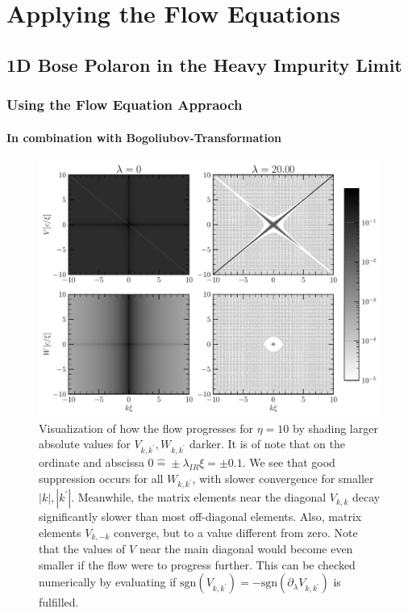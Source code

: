 \chapter{Applying the Flow Equations}\label{Results}
\section{1D Bose Polaron in the Heavy Impurity Limit}
\subsection{Using the Flow Equation Appraoch}
\subsubsection{In combination with Bogoliubov-Transformation}
\begin{figure}[H]
    \centering
    \includegraphics[width=\textwidth]{figures/plots/PDF/FlowIllustration.pdf}
    \caption[Flow Visualization for $\eta=10$]{Visualization of how the flow progresses for $\eta=10$ by shading larger absolute values for $V_{k,k^\prime},W_{k,k^\prime}$ darker. It is of note that on the ordinate and abscissa $0\widehat = \pm \lambda_{IR}\xi=\pm 0.1$. We see that good suppression occurs for all $W_{k,k^\prime}$, with slower convergence for smaller $|k|,|k^\prime|$.  Meanwhile, the matrix elements near the diagonal $V_{k,k}$ decay significantly slower than most off-diagonal elements. Also, matrix elements $V_{k,-k}$ converge, but to a value different from zero. Note that the values of $V$ near the main diagonal would  become even smaller if the flow were to progress further. This can be checked numerically by evaluating if $\mathrm{sgn}\left( V_{k,k^\prime}\right)=-\mathrm{sgn}\left( \partial_\lambda V_{k,k^\prime}\right)$ is fulfilled.}
    \label{FlowIllustration}
\end{figure}
